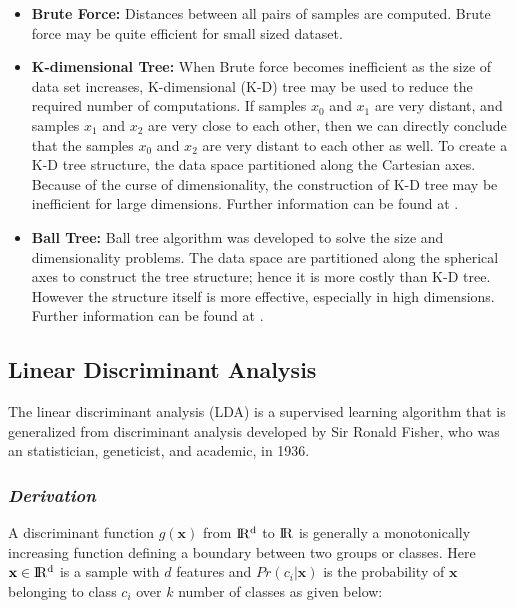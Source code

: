 \begin{itemize}
	\item \textbf{Brute Force:} Distances between all pairs of samples are computed. Brute force may be quite efficient for small sized dataset.
	
	\item \textbf{K-dimensional Tree:} When Brute force becomes inefficient as the size of  data set increases, K-dimensional (K-D) tree may be used to reduce the required number of computations. If samples $x_{0}$ and $x_{1}$ are very distant, and samples $x_{1}$ and $x_{2}$ are very close to each other, then we can directly conclude that the samples $x_{0}$ and $x_{2}$ are very distant to each other as well. To create a K-D tree structure, the data space partitioned along the Cartesian axes. Because of the curse of dimensionality, the construction of K-D tree may be inefficient for large dimensions. Further information can be found at \cite{kd_tree}.
	
	\item \textbf{Ball Tree:} Ball tree algorithm was developed to solve the size and dimensionality problems. The data space are partitioned along the spherical axes to construct the tree structure; hence it is more costly than K-D tree. However the structure itself is more effective, especially in high dimensions. Further information can be found at \cite{ball_tree}.
	
\end{itemize}

\subsection{Linear Discriminant Analysis}

The linear discriminant analysis (LDA) is a supervised learning algorithm that is generalized from discriminant analysis developed by Sir Ronald Fisher, who was an statistician, geneticist, and academic, in 1936.

\subsubsection*{\textit{Derivation}}

A discriminant function $g(\textbf{x})$ from $\rm I\!R^{d}$ to $\rm I\!R$ is generally a monotonically increasing function defining a boundary between two groups or classes. Here $\textbf{x} \in \rm I\!R^{d}$ is a sample with $d$ features and $Pr(c_{i} | \textbf{x})$ is the probability of $\textbf{x}$ belonging to class $c_{i}$ over $k$ number of classes as given below:

